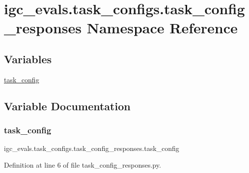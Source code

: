 \hypertarget{namespaceigc__evals_1_1task__configs_1_1task__config__responses}{}\section{igc\+\_\+evals.\+task\+\_\+configs.\+task\+\_\+config\+\_\+responses Namespace Reference}
\label{namespaceigc__evals_1_1task__configs_1_1task__config__responses}
\subsection*{Variables}
\begin{DoxyCompactItemize}
\item 
\hyperlink{namespaceigc__evals_1_1task__configs_1_1task__config__responses_ac0c50e1b1f864b396f86784880381ac8}{task\+\_\+config}
\end{DoxyCompactItemize}


\subsection{Variable Documentation}
\mbox{\label{namespaceigc__evals_1_1task__configs_1_1task__config__responses_ac0c50e1b1f864b396f86784880381ac8}} 
\subsubsection{\texorpdfstring{task\+\_\+config}{task\_config}}
{\footnotesize\ttfamily igc\+\_\+evals.\+task\+\_\+configs.\+task\+\_\+config\+\_\+responses.\+task\+\_\+config}



Definition at line 6 of file task\+\_\+config\+\_\+responses.\+py.

